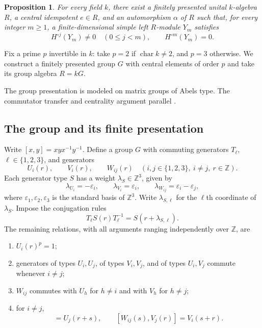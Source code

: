 \documentclass[11pt]{article}
\numberwithin{equation}{section}
\newtheorem{proposition}[theorem]{Proposition}
\theoremstyle{definition}
\theoremstyle{remark}
\newcommand{\Z}{\mathbb Z}
\begin{document}
\begin{proposition}
\label{prop:selection}
For every field $k$, there exist a finitely presented unital $k$-algebra $R$, a central
idempotent $e\in R$, and an automorphism $\alpha$ of $R$ such that, for
every integer $m\geq 1$, a finite-dimensional simple left $R$-module $Y_m$
satisfies
\begin{equation}
  H^{\circ j}(Y_m)\neq 0\quad(0\leq j<m),
  \qquad H^{\circ m}(Y_m)=0.
  \label{eq:extinction}
\end{equation}
\end{proposition}

Fix a prime $p$ invertible in $k$: take $p=2$ if $\operatorname{char}k\ne2$,
and $p=3$ otherwise. We construct a finitely presented group $G$
with central elements of order $p$ and take its group algebra $R=kG$.

The group presentation is modeled on matrix groups of Abels type.
The commutator transfer and centrality argument parallel
\cite[Proposition~4.9, equations~(4.9)--(4.10)]{Rego2022}.

\subsection{The group and its finite presentation}

Write $[x,y]=xyx^{-1}y^{-1}$. Define a group $G$ with commuting
generators $T_\ell$, $\ell\in\{1,2,3\}$, and generators
\[
  U_i(r),\qquad V_i(r),\qquad W_{ij}(r)
  \quad(i,j\in\{1,2,3\},\ i\neq j,\ r\in\Z).
\]
Each generator type $S$ has a weight $\lambda_S\in\Z^3$, given by
\begin{equation}
  \lambda_{U_i}=-\varepsilon_i,\qquad
  \lambda_{V_i}=\varepsilon_i,\qquad
  \lambda_{W_{ij}}=\varepsilon_i-\varepsilon_j,
  \label{eq:group-weights}
\end{equation}
where $\varepsilon_1,\varepsilon_2,\varepsilon_3$ is the standard basis
of $\Z^3$. Write $\lambda_{S,\ell}$ for the $\ell$th coordinate
of $\lambda_S$. Impose the conjugation rules
\begin{equation}
  T_\ell S(r)T_\ell^{-1}=S(r+\lambda_{S,\ell}).
  \label{eq:group-conjugation}
\end{equation}
The remaining relations, with all arguments ranging independently
over $\Z$, are
\begin{enumerate}
  \item $U_i(r)^p=1$;
  \item generators of types $U_i,U_j$, of types $V_i,V_j$, and of
    types $U_i,V_j$ commute whenever $i\neq j$;
  \item $W_{ij}$ commutes with $U_h$ for $h\neq i$ and with $V_h$
    for $h\neq j$;
  \item for $i\neq j$,
  \begin{equation}
    [U_i(r),W_{ij}(s)]=U_j(r+s),\qquad
    [W_{ij}(s),V_j(r)]=V_i(s+r).
    \label{eq:group-commutator-relations}
  \end{equation}
\end{enumerate}
\end{document}
